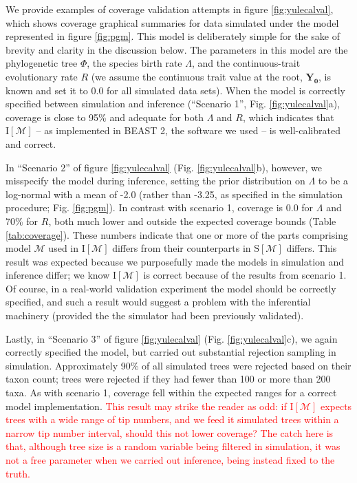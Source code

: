 \documentclass[oneside]{article}
\begin{document}
We provide examples of coverage validation attempts in figure \ref{fig:yulecalval}, which shows coverage graphical summaries for data simulated under the model represented in figure \ref{fig:pgm}.
This model is deliberately simple for the sake of brevity and clarity in the discussion below.
The parameters in this model are the phylogenetic tree $\Phi$, the species birth rate $\Lambda$, and the continuous-trait evolutionary rate $R$ (we assume the continuous trait value at the root, $\boldsymbol{Y_0}$, is known and set it to $\boldsymbol{0.0}$ for all simulated data sets).
When the model is correctly specified between simulation and inference (``Scenario 1'', Fig. \ref{fig:yulecalval}a), coverage is close to 95\% and adequate for both $\Lambda$ and $R$, which indicates that $\text{I}[\mathcal{M}]$ -- as implemented in BEAST 2, the software we used -- is well-calibrated and correct.

In ``Scenario 2'' of figure \ref{fig:yulecalval} (Fig. \ref{fig:yulecalval}b), however, we misspecify the model during inference, setting the prior distribution on $\Lambda$ to be a log-normal with a mean of -2.0 (rather than -3.25, as specified in the simulation procedure; Fig. \ref{fig:pgm}).
In contrast with scenario 1, coverage is 0.0 for $\Lambda$ and 70\% for $R$, both much lower and outside the expected coverage bounds (Table \ref{tab:coverage}).
These numbers indicate that one or more of the parts comprising model $\mathcal{M}$ used in $\text{I}[\mathcal{M}]$ differs from their counterparts in $\text{S}[\mathcal{M}]$ differs.
This result was expected because we purposefully made the models in simulation and inference differ; we know $\text{I}[\mathcal{M}]$ is correct because of the results from scenario 1.
Of course, in a real-world validation experiment the model should be correctly specified, and such a result would suggest a problem with the inferential machinery (provided the the simulator had been previously validated).

Lastly, in ``Scenario 3'' of figure \ref{fig:yulecalval} (Fig. \ref{fig:yulecalval}c), we again correctly specified the model, but carried out substantial rejection sampling in simulation.
Approximately 90\% of all simulated trees were rejected based on their taxon count; trees were rejected if they had fewer than 100 or more than 200 taxa.
As with scenario 1, coverage fell within the expected ranges for a correct model implementation.
\textcolor{red}{This result may strike the reader as odd: if $\text{I}[\mathcal{M}]$ expects trees with a wide range of tip numbers, and we feed it simulated trees within a narrow tip number interval, should this not lower coverage?
The catch here is that, although tree size is a random variable being filtered in simulation, it was not a free parameter when we carried out inference, being instead fixed to the truth.}
\end{document}
